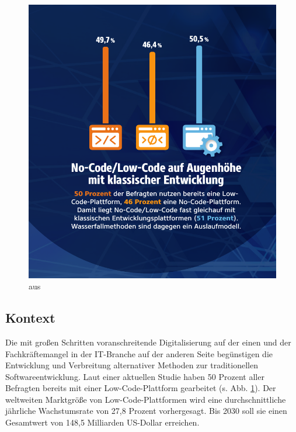 \documentclass[acmtog, language=ngerman]{acmart}
\begin{document}
\begin{figure}[H]
    \centering
    \includegraphics[width=\linewidth]{images/studie-low-code-cropped.pdf}
    \caption{aus \cite{studie_low_code}}
    \label{fig:low_code_no_code}
\end{figure}

\subsection{Kontext}
Die mit großen Schritten voranschreitende Digitalisierung auf der einen und der Fachkräftemangel in der IT-Branche auf der anderen Seite begünstigen die Entwicklung und Verbreitung alternativer Methoden zur traditionellen Softwareentwicklung. \cite{flake_fachkraeftemangel_2023} Laut einer aktuellen Studie haben 50 Prozent aller Befragten bereits mit einer Low-Code-Plattform gearbeitet (s. Abb. \ref{fig:low_code_no_code}). Der weltweiten Marktgröße von Low-Code-Plattformen wird eine durchschnittliche jährliche Wachstumsrate von 27,8 Prozent vorhergesagt. Bis 2030 soll sie einen Gesamtwert von 148,5 Milliarden US-Dollar erreichen. \cite{straits_low_code_development_platform_market_2021} 
\end{document}
